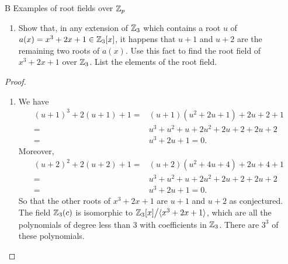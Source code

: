 \begin{exercise}{B Examples of root fields over $\mathbb{Z}_p$}
\begin{enumerate}
    \item Show that, in any extension of $\mathbb{Z}_3$ which contains a root $u$ of $a(x)=x^3+2x+1\in\mathbb{Z}_3[x]$, it happens that $u+1$ and $u+2$ are the remaining two roots of $a(x)$. Use this fact to find the root field of $x^3+2x+1$ over $\mathbb{Z}_3$. List the elements of the root field.
\end{enumerate}
\end{exercise}
\begin{proof}
 \begin{enumerate}
     \item We have
     \begin{align*}
         (u+1)^3+2(u+1)+1 =& (u+1)(u^2+2u+1)+2u+2+1\\
         =& u^3+u^2+u+2u^2+2u+2+2u+2\\
         =& u^3+2u+1=0.
     \end{align*}
     Moreover,
     \begin{align*}
         (u+2)^2+2(u+2)+1 =& (u+2)(u^2+4u+4)+2u+4+1\\
         =& u^3+u^2+u+2u^2+2u+2+2u+2\\
         =& u^3+2u+1=0.
     \end{align*}
    So that the other roots of $x^3+2x+1$ are $u+1$ and $u+2$ as conjectured. The field $\mathbb{Z}_3(c)$ is isomorphic to ${\textstyle \mathbb{Z}_3[x]}\big/{\textstyle \langle x^3+2x+1\rangle}$, which are all the polynomials of degree less than 3 with coefficients in $\mathbb{Z}_3$. There are $3^3$ of these polynomials.
 \end{enumerate}
\end{proof}

